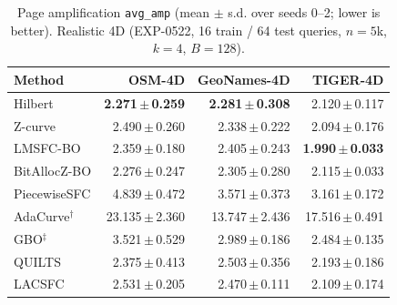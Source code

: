 \begin{table}[t]
\centering\small
\caption{Page amplification \texttt{avg\_amp} (mean $\pm$ s.d. over seeds 0--2; lower is better). Realistic 4D (EXP-0522, 16 train / 64 test queries, $n=5$k, $k=4$, $B=128$).}
\label{tab:exp1110_0522_avg_amp}
\begin{tabular}{lrrr}
\toprule
Method & OSM-4D & GeoNames-4D & TIGER-4D \\
\midrule
Hilbert & \textbf{2.271\,$\pm$\,0.259} & \textbf{2.281\,$\pm$\,0.308} & 2.120\,$\pm$\,0.117 \\
Z-curve & 2.490\,$\pm$\,0.260 & 2.338\,$\pm$\,0.222 & 2.094\,$\pm$\,0.176 \\
LMSFC-BO & 2.359\,$\pm$\,0.180 & 2.405\,$\pm$\,0.243 & \textbf{1.990\,$\pm$\,0.033} \\
BitAllocZ-BO & 2.276\,$\pm$\,0.247 & 2.305\,$\pm$\,0.280 & 2.115\,$\pm$\,0.033 \\
PiecewiseSFC & 4.839\,$\pm$\,0.472 & 3.571\,$\pm$\,0.373 & 3.161\,$\pm$\,0.172 \\
AdaCurve$^\dagger$ & 23.135\,$\pm$\,2.360 & 13.747\,$\pm$\,2.436 & 17.516\,$\pm$\,0.491 \\
GBO$^\ddagger$ & 3.521\,$\pm$\,0.529 & 2.989\,$\pm$\,0.186 & 2.484\,$\pm$\,0.135 \\
QUILTS & 2.375\,$\pm$\,0.413 & 2.503\,$\pm$\,0.356 & 2.193\,$\pm$\,0.186 \\
LACSFC & 2.531\,$\pm$\,0.205 & 2.470\,$\pm$\,0.111 & 2.109\,$\pm$\,0.174 \\
\bottomrule
\end{tabular}
\end{table}


